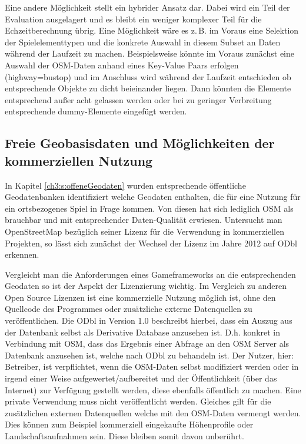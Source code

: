 Eine andere Möglichkeit stellt ein hybrider Ansatz dar. Dabei wird ein Teil der Evaluation ausgelagert und es bleibt ein weniger komplexer Teil für die Echzeitberechnung übrig. Eine Möglichkeit wäre es z.\,B. im Voraus eine Selektion der Spielelementtypen und die konkrete Auswahl in diesem Subset an Daten während der Laufzeit zu machen. Beispielsweise könnte im Voraus zunächst eine Auswahl der OSM-Daten anhand eines Key-Value Paars erfolgen (highway=bustop) und im Anschluss wird während der Laufzeit entschieden ob entsprechende Objekte zu dicht beieinander liegen. Dann könnten die Elemente entsprechend außer acht gelassen werden oder bei zu geringer Verbreitung entsprechende dummy-Elemente eingefügt werden.

\subsection*{Freie Geobasisdaten und Möglichkeiten der kommerziellen Nutzung}

In Kapitel \ref{ch3:s:offeneGeodaten} wurden entsprechende öffentliche Geodatenbanken identifiziert welche Geodaten enthalten, die für eine Nutzung für ein ortsbezogenes Spiel in Frage kommen. Von diesen hat sich lediglich OSM als brauchbar und mit entsprechender Daten-Qualität erwiesen. Untersucht man OpenStreetMap bezüglich seiner Lizenz für die Verwendung in kommerziellen Projekten, so lässt sich zunächst der Wechsel der Lizenz im Jahre 2012 auf ODbl erkennen.\cite{Ramthun.2012}

Vergleicht man die Anforderungen eines Gameframeworks an die entsprechenden Geodaten so ist der Aspekt der Lizenzierung wichtig. Im Vergleich zu anderen Open Source Lizenzen ist eine kommerzielle Nutzung möglich ist, ohne den Quellcode des Programmes oder zusätzliche externe Datenquellen zu veröffentlichen.
Die ODbl in Version 1.0 beschreibt hierbei, dass ein Auszug aus der Datenbank selbst als Derivative Database anzusehen ist.\cite{ODbl.2014} D.h. konkret in Verbindung mit OSM, dass das Ergebnis einer Abfrage an den OSM Server als Datenbank anzusehen ist, welche nach ODbl zu behandeln ist. Der Nutzer, hier: Betreiber, ist verpflichtet, wenn die OSM-Daten selbst modifiziert werden oder in irgend einer Weise aufgewertet/aufbereitet und der Öffentlichkeit (über das Internet) zur Verfügung gestellt werden, diese ebenfalls öffentlich zu machen. Eine private Verwendung muss nicht veröffentlicht werden. Gleiches gilt für die zusätzlichen externen Datenquellen welche mit den OSM-Daten vermengt werden. Dies können zum Beispiel kommerziell eingekaufte Höhenprofile oder Landschaftsaufnahmen sein. Diese bleiben somit davon unberührt.

